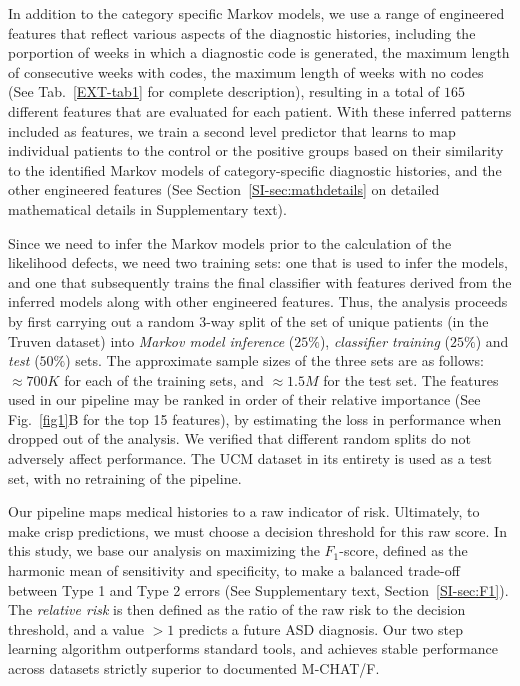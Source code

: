 \documentclass[onecolumn,,10pt]{IEEEtran}
\def\treatment{positive\xspace}
\begin{document}
In addition to the category specific Markov models, we use a range of engineered features that reflect various aspects of the diagnostic histories, including the porportion of weeks in which a diagnostic code is generated, the maximum length of consecutive weeks with codes, the maximum length of weeks with no codes (See Tab.~\ref{EXT-tab1} for complete description), resulting in a total of $165$ different features that are evaluated for each patient. With these inferred patterns included as features,  we train a second level predictor that learns to map   individual patients  to the control or the \treatment groups based on their  similarity  to the identified  Markov models of category-specific diagnostic histories, and the other engineered features (See Section~\ref{SI-sec:mathdetails} on detailed mathematical details  in Supplementary  text).


Since we need to infer the Markov models prior to the calculation of the likelihood defects, we need two training sets: one that is used to infer the models, and one that subsequently trains the final classifier  with features  derived  from the inferred models along with other engineered features. Thus, the analysis proceeds by first carrying out a random 3-way split of the set of unique patients (in the Truven dataset) into \textit{Markov model inference} ($25\%$), \textit{classifier training} ($25\%$) and \textit{test} ($50\%$) sets. The approximate sample sizes of the three sets are as follows: $\approx 700K$ for each of  the training sets, and $\approx 1.5M$ for the test set. The features used in our pipeline may be ranked in order of their relative importance (See Fig.~\ref{fig1}B for the top 15 features), by
estimating the loss in performance when dropped out of the analysis. We verified that different random splits do not adversely affect performance. The UCM dataset in its entirety is used as a test set, with no retraining of the pipeline.

Our pipeline maps medical histories to a   raw indicator of 
risk. Ultimately, to make crisp predictions, we must choose  a decision threshold for this raw score. In this study, we base our analysis on maximizing the $F_1$-score, defined as the harmonic mean of sensitivity and specificity, to make a   balanced trade-off between Type 1 and Type 2 errors (See Supplementary text, Section~\ref{SI-sec:F1}). The \textit{relative risk} is then defined as the ratio of the raw  risk to the  decision threshold, and a value  $>1$  predicts a future ASD diagnosis. Our two step learning algorithm outperforms standard tools, and achieves  stable performance across datasets strictly superior to documented M-CHAT/F.
\end{document}
